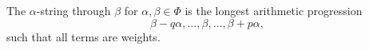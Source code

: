 The $\alpha$-string through $\beta$ for $\alpha, \beta \in \Phi$ is the longest
arithmetic progression
\[ \beta - q\alpha, \ldots, \beta, \ldots, \beta + p\alpha, \]
such that all terms are weights.

